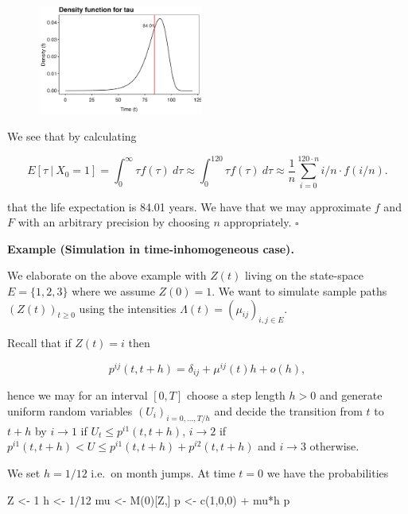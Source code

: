 \documentclass[a4paper,10pt,openany]{book}
\newenvironment{Shaded}{\begin{snugshade}}{\end{snugshade}}
\newcommand{\DecValTok}[1]{\textcolor[rgb]{0.00,0.00,0.81}{#1}}
\newcommand{\FunctionTok}[1]{\textcolor[rgb]{0.00,0.00,0.00}{#1}}
\newcommand{\NormalTok}[1]{#1}
\newcommand{\OtherTok}[1]{\textcolor[rgb]{0.56,0.35,0.01}{#1}}
\newcommand{\SpecialCharTok}[1]{\textcolor[rgb]{0.00,0.00,0.00}{#1}}
\begin{document}
\begin{figure}[H]
  \begin{center}
    \includegraphics[width=0.48\textwidth]{figures/ex1_PT_dist.png}
  \end{center}
\end{figure}

We see that by calculating

\[
E[\tau\ \vert\ X_0=1]=\int_0^\infty \tau f(\tau)\ d\tau\approx\int_0^{120}\tau f(\tau)\ d\tau\approx\frac{1}{n}\sum_{i=0}^{120\cdot n} i/n\cdot f(i/n).
\]

that the life expectation is 84.01 years. We have that we may approximate \(f\) and \(F\) with an arbitrary precision by choosing \(n\) appropriately. \(\square\)

\textbf{Example (Simulation in time-inhomogeneous case).}

We elaborate on the above example with \(Z(t)\) living on the state-space \(E=\{1,2,3\}\) where we assume \(Z(0)=1\). We want to simulate sample paths \((Z(t))_{t\ge 0}\) using the intensities \(\Lambda(t)=(\mu_{ij})_{i,j\in E}\).

Recall that if \(Z(t)=i\) then

\[
p^{ij}(t,t+h)=\delta_{ij}+\mu^{ij}(t)h+o(h),
\]

hence we may for an interval \([0,T]\) choose a step length \(h>0\) and generate uniform random variables \((U_i)_{i=0,...,T/h}\) and decide the transition from \(t\) to \(t+h\) by \(i\to 1\) if \(U_t\le p^{i1}(t,t+h)\), \(i\to 2\) if \(p^{i1}(t,t+h)<U\le p^{i1}(t,t+h)+p^{i2}(t,t+h)\) and \(i\to 3\) otherwise.

We set \(h=1/12\) i.e.~on month jumps. At time \(t=0\) we have the probabilities

\begin{Shaded}
\begin{Highlighting}[]
\NormalTok{Z }\OtherTok{\textless{}{-}} \DecValTok{1}
\NormalTok{h }\OtherTok{\textless{}{-}} \DecValTok{1}\SpecialCharTok{/}\DecValTok{12}
\NormalTok{mu }\OtherTok{\textless{}{-}} \FunctionTok{M}\NormalTok{(}\DecValTok{0}\NormalTok{)[Z,]}
\NormalTok{p }\OtherTok{\textless{}{-}} \FunctionTok{c}\NormalTok{(}\DecValTok{1}\NormalTok{,}\DecValTok{0}\NormalTok{,}\DecValTok{0}\NormalTok{) }\SpecialCharTok{+}\NormalTok{ mu}\SpecialCharTok{*}\NormalTok{h}
\NormalTok{p}
\end{Highlighting}
\end{Shaded}
\end{document}
